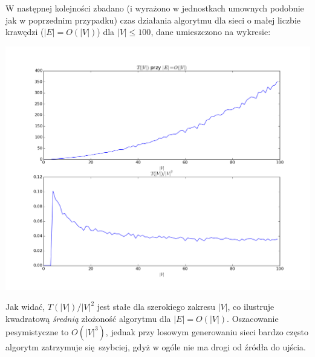 \documentclass{article}
\begin{document}
W następnej kolejności zbadano (i wyrażono w jednostkach umownych podobnie jak w poprzednim przypadku) czas działania algorytmu dla sieci o małej liczbie krawędzi ($|E| = O(|V|)$) dla $|V|\leq 100$, dane umieszczono na wykresie: 
\begin{center}
\includegraphics[scale=0.55]{malee.png}
\end{center}
Jak widać, $T(|V|)/|V|^2$ jest stałe dla szerokiego zakresu $|V|$, co ilustruje kwadratową \emph{średnią} złożoność algorytmu dla $|E|=O(|V|)$. Oszacowanie pesymistyczne to $O(|V|^3)$, jednak przy losowym generowaniu sieci bardzo często algorytm zatrzymuje się szybciej, gdyż w ogóle nie ma drogi od źródła do ujścia. 
\end{document}
